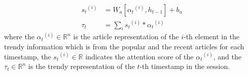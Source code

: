 
\begin{align*}
	{s_t}^{(i)} &= W_a[{\alpha_t}^{(i)}, h_{t-1}] + b_a \\
	\tau_t &= \sum_{i}{{s_t}^{(i)}*{\alpha_t}^{(i)}}
\end{align*}
where the ${\alpha_t}^{(i)} \in \mathbb{R}^{n}$ is the article representation of the $i$-th element in the trendy information which is from the popular and the recent articles for each timestamp,
the ${s_t}^{(i)} \in \mathbb{R}$ indicates the attention score of the ${\alpha_t}^{(i)}$,
and the $\tau_t \in \mathbb{R}^{n}$ is the trendy representation of the $t$-th timestamp in the session.

%

